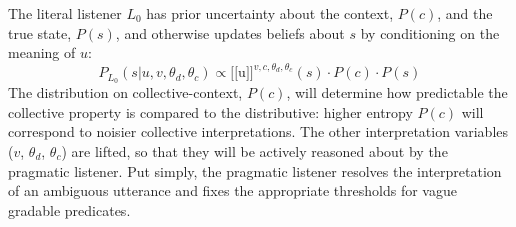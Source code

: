 \documentclass[preprint,12pt,authoryear,titlepage]{elsarticle}
\newcommand{\ndg}[1]{\textcolor{Green}{[ndg: #1]}}
\newcommand{\gcs}[1]{\textcolor{blue}{[gcs: #1]}}
\newcommand{\sem}[1]{\mbox{$[\![$#1$]\!]$}}
\newcommand{\lam}{$\lambda$}
\begin{document}
%
%


The literal listener $L_{0}$ has prior uncertainty about the context, $P(c)$, and the true state, $P(s)$, and otherwise updates beliefs about $s$ by conditioning on the meaning of $u$: 
$$P_{L_{0}}(s|u,v,\theta_d,\theta_c) \propto \sem{u}^{v,c,\theta_d,\theta_c}(s) \cdot P(c) \cdot P(s)$$
The distribution on collective-context, $P(c)$, will determine how predictable the collective property is compared to the distributive: higher entropy $P(c)$ will correspond to noisier collective interpretations.
The other interpretation variables ($v$, $\theta_d$, $\theta_c$) are lifted, so that they will be actively reasoned about by the pragmatic listener. Put simply, the pragmatic listener resolves the interpretation of an ambiguous utterance and fixes the appropriate thresholds for vague gradable predicates.
\end{document}
